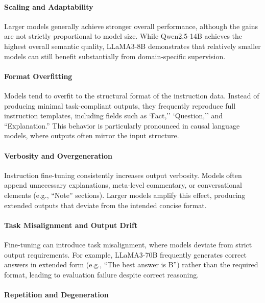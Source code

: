 \documentclass[a4paper,fleqn]{cas-sc}
\begin{document}
\paragraph{Scaling and Adaptability}

Larger models generally achieve stronger overall performance, although the gains are not strictly proportional to model size. While Qwen2.5-14B achieves the highest overall semantic quality, LLaMA3-8B demonstrates that relatively smaller models can still benefit substantially from domain-specific supervision.

\paragraph{Format Overfitting}

Models tend to overfit to the structural format of the instruction data. Instead of producing minimal task-compliant outputs, they frequently reproduce full instruction templates, including fields such as `Fact,'' `Question,'' and ``Explanation.'' This behavior is particularly pronounced in causal language models, where outputs often mirror the input structure.

\paragraph{Verbosity and Overgeneration}

Instruction fine-tuning consistently increases output verbosity. Models often append unnecessary explanations, meta-level commentary, or conversational elements (e.g., ``Note'' sections). Larger models amplify this effect, producing extended outputs that deviate from the intended concise format.

\paragraph{Task Misalignment and Output Drift}

Fine-tuning can introduce task misalignment, where models deviate from strict output requirements. For example, LLaMA3-70B frequently generates correct answers in extended form (e.g., ``The best answer is B'') rather than the required format, leading to evaluation failure despite correct reasoning.

\paragraph{Repetition and Degeneration}
\end{document}

